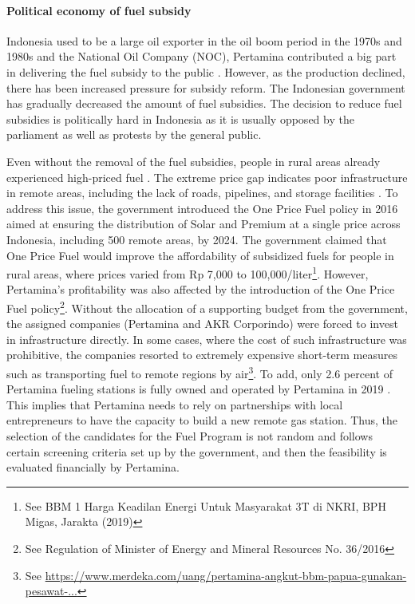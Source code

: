 \documentclass[letterpaper,12pt,leqno]{article}
\begin{document}
\paragraph{Political economy of fuel subsidy} Indonesia used to be a large oil exporter in the oil boom period in the 1970s and 1980s and the National Oil Company (NOC), Pertamina contributed a big part in delivering the fuel subsidy to the public \citep{ichsan_2022}. However, as the production declined, there has been increased pressure for subsidy reform. The Indonesian government has gradually decreased the amount of fuel subsidies. The decision to reduce fuel subsidies is politically hard in Indonesia as it is usually opposed by the parliament as well as protests by the general public.

Even without the removal of the fuel subsidies, people in rural areas already experienced high-priced fuel \citep{liputan_2016, jawapos_2017}. The extreme price gap indicates poor infrastructure in remote areas, including the lack of roads, pipelines, and storage facilities \citep{ichsan_2021}. To address this issue, the government introduced the One Price Fuel policy in 2016 aimed at ensuring the distribution of Solar and Premium at a single price across Indonesia, including 500 remote areas, by 2024. The government claimed that One Price Fuel would improve the affordability of subsidized fuels for people in rural areas, where prices varied from Rp 7,000 to 100,000/liter\footnote{See BBM 1 Harga Keadilan Energi Untuk Masyarakat 3T di NKRI, BPH Migas, Jarakta (2019)}. However, Pertamina's profitability was also affected by the introduction of the One Price Fuel policy\footnote{See Regulation of Minister of Energy and Mineral Resources No. 36/2016}. Without the allocation of a supporting budget from the government, the assigned companies (Pertamina and AKR Corporindo) were forced to invest in infrastructure directly. In some cases, where the cost of such infrastructure was prohibitive, the companies resorted to extremely expensive short-term measures such as transporting fuel to remote regions by air\footnote{See \href{https://www.merdeka.com/uang/pertamina-angkut-bbm-papua-gunakan-pesawat-kapasitas-4000-liter.html}{https://www.merdeka.com/uang/pertamina-angkut-bbm-papua-gunakan-pesawat-...}}. To add, only 2.6 percent of Pertamina fueling stations is fully owned and operated by Pertamina in 2019 \citep{pertamina_2020}. This implies that Pertamina needs to rely on partnerships with local entrepreneurs to have the capacity to build a new remote gas station. Thus, the selection of the candidates for the Fuel Program is not random and follows certain screening criteria set up by the government, and then the feasibility is evaluated financially by Pertamina.
\end{document}
